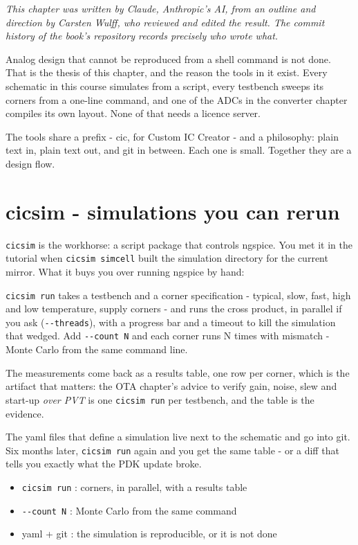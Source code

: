 \emph{This chapter was written by Claude, Anthropic's AI, from an
outline and direction by Carsten Wulff, who reviewed and edited the
result. The commit history of the book's repository records precisely
who wrote what.}

Analog design that cannot be reproduced from a shell command is not
done. That is the thesis of this chapter, and the reason the tools in it
exist. Every schematic in this course simulates from a script, every
testbench sweeps its corners from a one-line command, and one of the
ADCs in the converter chapter compiles its own layout. None of that
needs a licence server.

The tools share a prefix - cic, for Custom IC Creator - and a
philosophy: plain text in, plain text out, and git in between. Each one
is small. Together they are a design flow.

\section{cicsim - simulations you can
rerun}\label{cicsim---simulations-you-can-rerun}

\texttt{cicsim} is the workhorse: a script package that controls
ngspice. You met it in the tutorial when \texttt{cicsim\ simcell} built
the simulation directory for the current mirror. What it buys you over
running ngspice by hand:

\texttt{cicsim\ run} takes a testbench and a corner specification -
typical, slow, fast, high and low temperature, supply corners - and runs
the cross product, in parallel if you ask (\texttt{-\/-threads}), with a
progress bar and a timeout to kill the simulation that wedged. Add
\texttt{-\/-count\ N} and each corner runs N times with mismatch - Monte
Carlo from the same command line.

The measurements come back as a results table, one row per corner, which
is the artifact that matters: the OTA chapter's advice to verify gain,
noise, slew and start-up \emph{over PVT} is one \texttt{cicsim\ run} per
testbench, and the table is the evidence.

The yaml files that define a simulation live next to the schematic and
go into git. Six months later, \texttt{cicsim\ run} again and you get
the same table - or a diff that tells you exactly what the PDK update
broke.

\begin{itemize}
\tightlist
\item
  \texttt{cicsim\ run} : corners, in parallel, with a results table
\item
  \texttt{-\/-count\ N} : Monte Carlo from the same command
\item
  yaml + git : the simulation is reproducible, or it is not done
\end{itemize}

